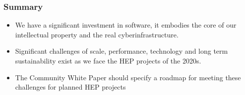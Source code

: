 \begin{frame}
\frametitle{Summary}

\begin{itemize}
\item We have a significant investment in software, it embodies the core of our intellectual property and the real cyberinfrastructure.
\item Significant challenges of scale, performance, technology and long term sustainability exist as we face the HEP projects of the 2020s.
\item The Community White Paper should specify a roadmap for meeting these challenges for planned HEP projects
\end{itemize}

\end{frame}


